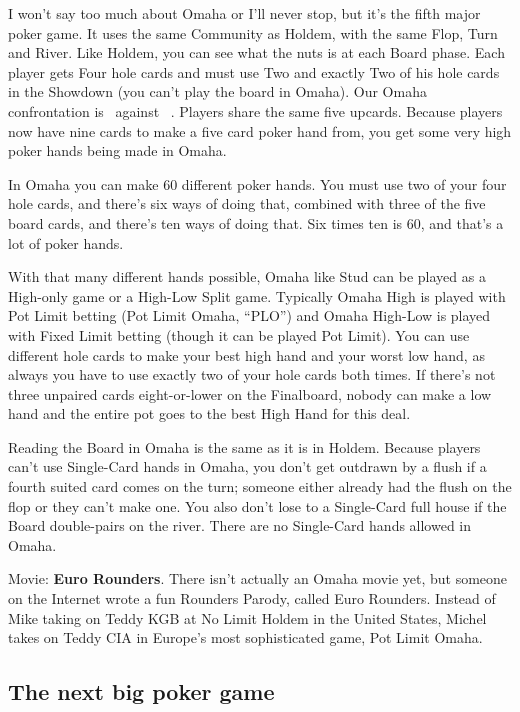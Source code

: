 I won't say too much about Omaha or I'll never stop, but it's the
fifth major poker game. It uses the same Community as
Holdem, with the same Flop, Turn and River. Like Holdem, you can see
what the nuts is at each Board phase. Each player gets Four hole
cards and must use Two and exactly Two of his hole cards in the
Showdown (you can't play the board in Omaha). Our Omaha confrontation
is 
\back\back\back\back\nines\Qd\Jd\tres\fourd\ against
\back\back\back\back\nines\Qd\Jd\tres\fourd\ . Players share the same five
upcards. Because players now have nine cards to make a five card poker
hand from, you get some very high poker hands being made in Omaha.

In Omaha you can make 60 different poker hands. You must use two of
your four hole cards, and there's six ways of doing that, combined
with three of the five board cards, and there's ten ways of doing
that. Six times ten is 60, and that's a lot of poker hands.

With that many different hands possible, Omaha like Stud can be played
as a High-only game or a High-Low Split game. Typically Omaha High is
played with Pot Limit betting (Pot Limit Omaha, ``PLO'') and Omaha
High-Low is played with Fixed Limit betting (though it can be played
Pot Limit). You can use different hole cards to make your best high
hand and your worst low hand, as always you have to use exactly two of
your hole cards both times. If there's not three unpaired cards
eight-or-lower on the Finalboard, nobody can make a low hand and the
entire pot goes to the best High Hand for this deal.

Reading the Board in Omaha is the same as it is in Holdem. Because
players can't use Single-Card hands in Omaha, you don't get outdrawn
by a flush if a fourth suited card comes on the turn; someone either
already had the flush on the flop or they can't make one. You also
don't lose to a Single-Card full house if the Board double-pairs on
the river. There are no Single-Card hands allowed in Omaha.

Movie: \textbf{Euro Rounders}. There isn't actually an Omaha movie
yet, but someone on the Internet wrote a fun Rounders Parody, called
Euro Rounders. Instead of Mike taking on Teddy KGB at No Limit Holdem
in the United States, Michel takes on Teddy CIA in Europe's most
sophisticated game, Pot Limit Omaha.

\subsection{The next big poker game}

